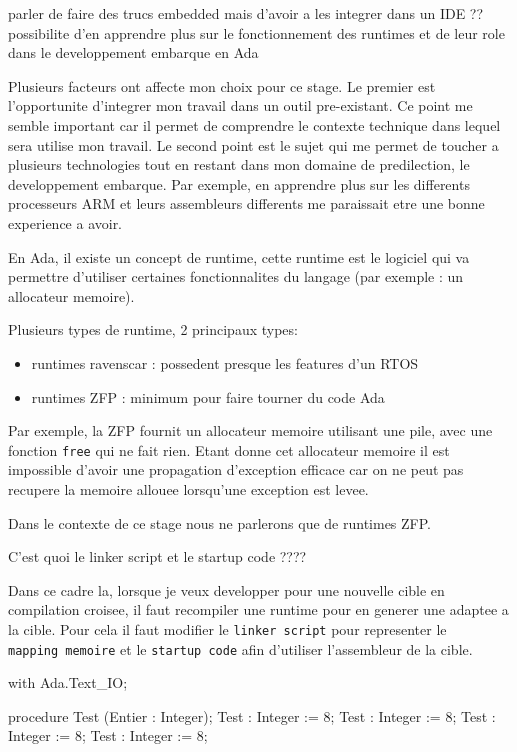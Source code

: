 \documentclass[11pt,]{article}
\newenvironment{Shaded}{\begin{snugshade}}{\end{snugshade}}
\newcommand{\KeywordTok}[1]{\textcolor[rgb]{0.94,0.87,0.69}{#1}}
\newcommand{\DataTypeTok}[1]{\textcolor[rgb]{0.87,0.87,0.75}{#1}}
\newcommand{\DecValTok}[1]{\textcolor[rgb]{0.86,0.86,0.80}{#1}}
\newcommand{\NormalTok}[1]{\textcolor[rgb]{0.80,0.80,0.80}{#1}}
\providecommand{\tightlist}{%
  \setlength{\itemsep}{0pt}\setlength{\parskip}{0pt}}
\begin{document}
parler de faire des trucs embedded mais d'avoir a les integrer dans un
IDE ?? possibilite d'en apprendre plus sur le fonctionnement des
runtimes et de leur role dans le developpement embarque en Ada

Plusieurs facteurs ont affecte mon choix pour ce stage. Le premier est
l'opportunite d'integrer mon travail dans un outil pre-existant. Ce
point me semble important car il permet de comprendre le contexte
technique dans lequel sera utilise mon travail. Le second point est le
sujet qui me permet de toucher a plusieurs technologies tout en restant
dans mon domaine de predilection, le developpement embarque. Par
exemple, en apprendre plus sur les differents processeurs ARM et leurs
assembleurs differents me paraissait etre une bonne experience a avoir.

En Ada, il existe un concept de runtime, cette runtime est le logiciel
qui va permettre d'utiliser certaines fonctionnalites du langage (par
exemple : un allocateur memoire).

Plusieurs types de runtime, 2 principaux types:

\begin{itemize}
\tightlist
\item
  runtimes ravenscar : possedent presque les features d'un RTOS
\item
  runtimes ZFP : minimum pour faire tourner du code Ada
\end{itemize}

Par exemple, la ZFP fournit un allocateur memoire utilisant une pile,
avec une fonction \texttt{free} qui ne fait rien. Etant donne cet
allocateur memoire il est impossible d'avoir une propagation d'exception
efficace car on ne peut pas recupere la memoire allouee lorsqu'une
exception est levee.

Dans le contexte de ce stage nous ne parlerons que de runtimes ZFP.

C'est quoi le linker script et le startup code ????

Dans ce cadre la, lorsque je veux developper pour une nouvelle cible en
compilation croisee, il faut recompiler une runtime pour en generer une
adaptee a la cible. Pour cela il faut modifier le
\texttt{linker\ script} pour representer le \texttt{mapping\ memoire} et
le \texttt{startup\ code} afin d'utiliser l'assembleur de la cible.

\begin{Shaded}
\begin{Highlighting}[]
\KeywordTok{with}\NormalTok{ Ada.Text_IO;}

\KeywordTok{procedure}\NormalTok{ Test (Entier : }\DataTypeTok{Integer}\NormalTok{);}
\NormalTok{Test : }\DataTypeTok{Integer}\NormalTok{ := }\DecValTok{8}\NormalTok{;}
\NormalTok{Test : }\DataTypeTok{Integer}\NormalTok{ := }\DecValTok{8}\NormalTok{;}
\NormalTok{Test : }\DataTypeTok{Integer}\NormalTok{ := }\DecValTok{8}\NormalTok{;}
\NormalTok{Test : }\DataTypeTok{Integer}\NormalTok{ := }\DecValTok{8}\NormalTok{;}
\end{Highlighting}
\end{Shaded}
\end{document}
